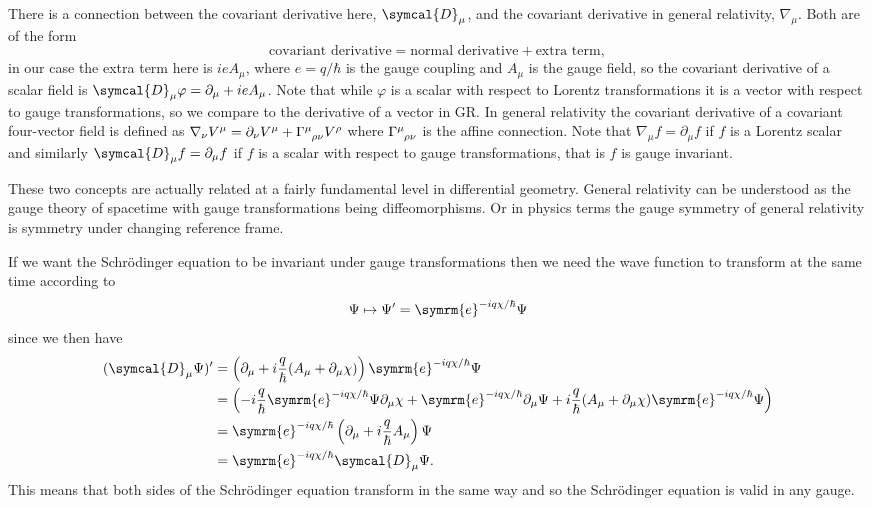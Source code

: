 \documentclass[fleqn]{NotesClass}
\newcommand{\e}{\symrm{e}}
\newcommand{\covariantDerivative}{\symcal{D}}
\begin{document}
    \begin{rmk}
        There is a connection between the covariant derivative here, \(\covariantDerivative_\mu\), and the covariant derivative in general relativity, \(\nabla_\mu\).
        Both are of the form
        \begin{equation}
            \text{covariant derivative} = \text{normal derivative} + \text{extra term},
        \end{equation}
        in our case the extra term here is \(ieA_\mu\), where \(e = q/\hbar\) is the gauge coupling and \(A_\mu\) is the gauge field, so the covariant derivative of a scalar field is \(\covariantDerivative_\mu \varphi = \partial_\mu + ieA_\mu\).
        Note that while \(\varphi\) is a scalar with respect to Lorentz transformations it is a vector with respect to gauge transformations, so we compare to the derivative of a vector in GR.
        In general relativity the covariant derivative of a covariant four-vector field is defined as \(\nabla_\nu V^\mu = \partial_\nu V^\mu + \tensor{\Gamma}{^\mu_{\rho\nu}}V^\rho\) where \(\tensor{\Gamma}{^\mu_{\rho\nu}}\) is the affine connection.
        Note that \(\nabla_\mu f = \partial_\mu f\) if \(f\) is a Lorentz scalar and similarly \(\covariantDerivative_\mu f = \partial_\mu f\) if \(f\) is a scalar with respect to gauge transformations, that is \(f\) is gauge invariant.
        
        These two concepts are actually related at a fairly fundamental level in differential geometry.
        General relativity can be understood as the gauge theory of spacetime with gauge transformations being diffeomorphisms.
        Or in physics terms the gauge symmetry of general relativity is symmetry under changing reference frame.
    \end{rmk}
    
    If we want the Schrödinger equation to be invariant under gauge transformations then we need the wave function to transform at the same time according to
    \begin{equation}
        \Psi \mapsto \Psi' = \e^{-iq \chi / \hbar} \Psi
    \end{equation}
    since we then have
    \begin{align}
        (\covariantDerivative_\mu \Psi)' &= \left( \partial_\mu + i\frac{q}{\hbar} (A_\mu + \partial_\mu \chi) \right)\e^{-iq\chi/\hbar}\Psi\\
        &= \left( -i\frac{q}{\hbar} \e^{-iq\chi/\hbar}\Psi \partial_\mu \chi + \e^{-iq \chi/\hbar}\partial_\mu \Psi + i\frac{q}{\hbar} (A_\mu + \partial_\mu \chi) \e^{-iq\chi/\hbar}\Psi \right)\\
        &= \e^{-iq\chi/\hbar} \left( \partial_\mu + i\frac{q}{\hbar}A_\mu \right) \Psi\\
        &= \e^{-iq\chi/\hbar} \covariantDerivative_\mu \Psi.
    \end{align}
    This means that both sides of the Schrödinger equation transform in the same way and so the Schrödinger equation is valid in any gauge.
    
\end{document}
